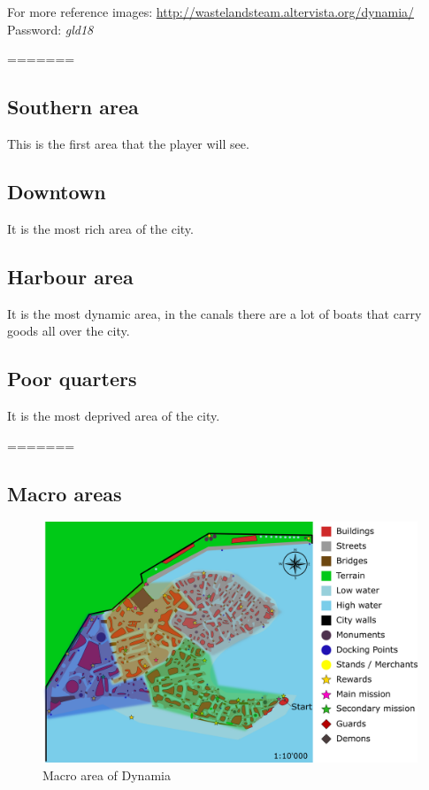 For more reference images: \url{http://wastelandsteam.altervista.org/dynamia/}\\
Password: \textit{gld18}

=======

\subsection{Southern area}
This is the first area that the player will see.

\subsection{Downtown}
It is the most rich area of the city.

\subsection{Harbour area}
It is the most dynamic area, in the canals there are a lot of boats that carry goods all over the city.

\subsection{Poor quarters}
It is the most deprived area of the city.

=======

\subsection{Macro areas}
\begin{figure}[H]
  \centering
  \includegraphics[width=\textwidth]{Images/Maps/dynamiaAreas}
  \caption{Macro area of Dynamia}
\end{figure}

